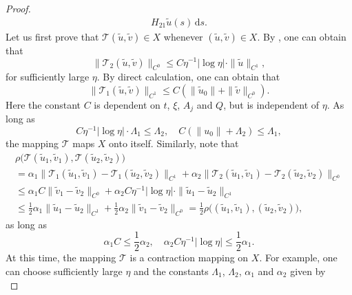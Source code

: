 \documentclass{article}
\theoremstyle{plain}%
\theoremstyle{definition}%
\theoremstyle{remark}%
\newcommand{\cT}{\mathcal{T}}
\newcommand{\rd}{\mathrm{d}}
\newcommand{\+}[1]{{\bm{#1}}}
\begin{document}
\begin{proof}
\begin{gather*}
    H_{21} \tilde{u}(s) \,\rd s.
  \end{gather*}
  Let us first prove that $\cT(\tilde{u}, \tilde{v}) \in X$ whenever 
  $(\tilde{u}, \tilde{v}) \in X$.
  By , one can obtain that 
  \begin{displaymath}
    \|\cT_2(\tilde{u}, \tilde{v})\|_{C^0} \le C 
    \eta^{-1} |\log \eta| \cdot 
    \|\tilde{u}\|_{C^1},
  \end{displaymath}
  for sufficiently large $\eta$. By direct calculation, one can 
  obtain that 
  \begin{displaymath}
    \|\cT_1(\tilde{u}, \tilde{v})\|_{C^1} \le  
    C (\|\tilde{u}_0\| + \|\tilde{v}\|_{C^0}).
  \end{displaymath}
  Here the constant $C$ is dependent on $t$, $\xi$, $A_j$ and $Q$, 
  but is independent of $\eta$.
  As long as 
  \begin{displaymath}
    C \eta^{-1} |\log \eta| \cdot \Lambda_1 \le \Lambda_2, \quad 
    C (\|u_0\| + \Lambda_2) \le \Lambda_1,
  \end{displaymath}
  the mapping $\cT$ maps $X$ onto itself. Similarly, note that 
  \begin{multline*}
    \rho \big( \cT(\tilde{u}_1, \tilde{v}_1), 
    \cT(\tilde{u}_2, \tilde{v}_2) \big) \\
    = \alpha_1 \| \cT_1(\tilde{u}_1, \tilde{v}_1) - 
    \cT_1(\tilde{u}_2, \tilde{v}_2) \|_{C^1} 
    + \alpha_2 \| \cT_2(\tilde{u}_1, \tilde{v}_1) - 
    \cT_2(\tilde{u}_2, \tilde{v}_2) \|_{C^0} \\
    \le \alpha_1 C 
    \| \tilde{v}_1 - \tilde{v}_2 \|_{C^0} + 
    \alpha_2 C \eta^{-1} |\log \eta| \cdot 
    \| \tilde{u}_1 - \tilde{u}_2 \|_{C^1}  \\ 
    \le \frac{1}{2} \alpha_1  
    \| \tilde{u}_1 - \tilde{u}_2 \|_{C^1} + 
    \frac{1}{2} \alpha_2 
    \| \tilde{v}_1 - \tilde{v}_2 \|_{C^0} 
    = \frac{1}{2} \rho \big( (\tilde{u}_1, \tilde{v}_1), 
    (\tilde{u}_2, \tilde{v}_2) \big),
  \end{multline*}
  as long as 
  \begin{displaymath}
    \alpha_1 C \le \frac{1}{2} \alpha_2, \quad 
    \alpha_2 C \eta^{-1} |\log \eta| \le \frac{1}{2} \alpha_1.
  \end{displaymath}
  At this time, the mapping $\cT$ is a contraction mapping on $X$.
  For example, one can choose sufficiently large $\eta$ and 
  the constants $\Lambda_1$, $\Lambda_2$, $\alpha_1$ and $\alpha_2$ 
  given by
  \begin{displaymath}

\end{displaymath}
\end{proof}
\end{document}
